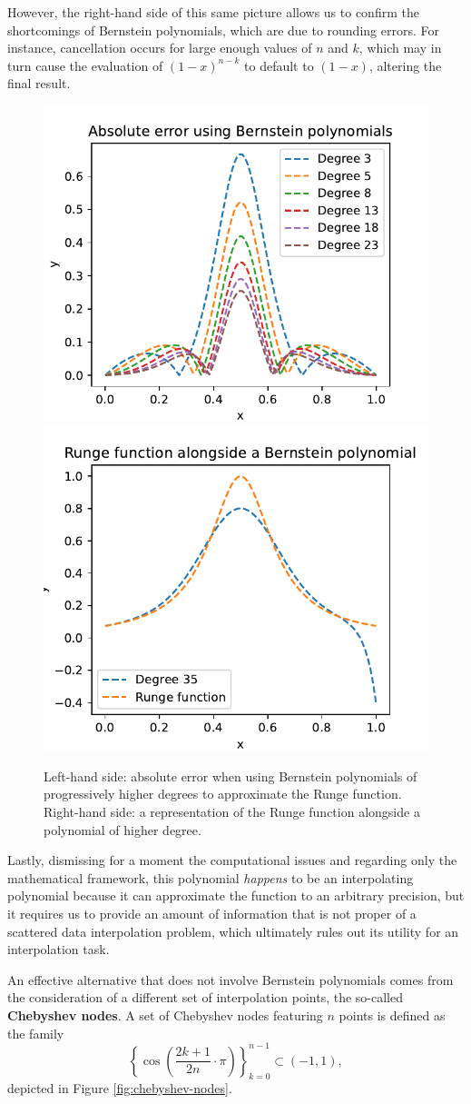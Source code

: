 \documentclass[12pt]{report} %
\newcommand{\tmstrong}[1]{\textbf{#1}}
\begin{document}
However, the right-hand side of this same picture allows us to confirm the shortcomings of Bernstein polynomials, which are due to rounding errors. For instance, cancellation occurs for large enough values of $n$ and $k$, which may in turn cause the evaluation of $(1-x)^{n-k}$ to default to $(1-x)$, altering the final result. 

\begin{figure}[ht]
    \centering
    \includegraphics[width=.5\textwidth]{imagenes/bernstein/Bernstein_Polynomials_Runge.pdf}\includegraphics[width=.5\textwidth]{imagenes/bernstein/Bernstein_Polynomials_Runge_D35.pdf}
    \caption{Left-hand side: absolute error when using Bernstein polynomials of progressively higher degrees to approximate the Runge function. Right-hand side: a representation of the Runge function alongside a polynomial of higher degree.}
    \label{fig:bernstein-runge}
\end{figure}

Lastly, dismissing for a moment the computational issues and regarding only the mathematical framework, this polynomial \textit{happens} to be an interpolating polynomial because it can approximate the function to an arbitrary precision, but it requires us to provide an amount of information that is not proper of a scattered data interpolation problem, which ultimately rules out its utility for an interpolation task.

An effective alternative that does not involve Bernstein polynomials comes
from the consideration of a different set of interpolation points, the
so-called {\tmstrong{Chebyshev nodes}}. A set of Chebyshev nodes featuring $n$
points is defined as the family
\begin{equation}
  \left\{ \cos \left( \frac{2 k + 1}{2 n} \cdot \pi \right) \right\}_{k =
  0}^{n - 1} \label{eqn-chebyshev-nodes} \subset (- 1, 1),
\end{equation}
depicted in Figure \ref{fig:chebyshev-nodes}. 
\end{document}
